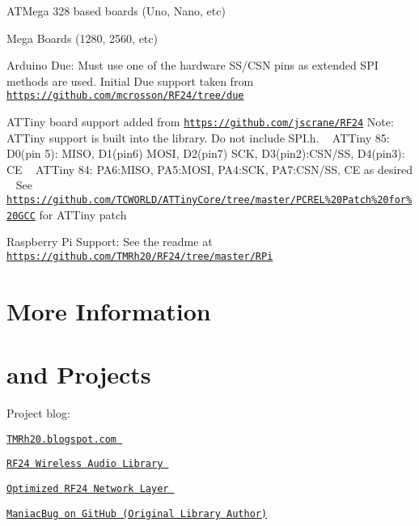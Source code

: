 \begin{DoxyItemize}
\item A\+T\+Mega 328 based boards (Uno, Nano, etc)
\item Mega Boards (1280, 2560, etc)
\item Arduino Due\+: Must use one of the hardware S\+S/\+C\+S\+N pins as extended S\+P\+I methods are used. Initial Due support taken from \href{https://github.com/mcrosson/RF24/tree/due}{\tt https\+://github.\+com/mcrosson/\+R\+F24/tree/due}
\item A\+T\+Tiny board support added from \href{https://github.com/jscrane/RF24}{\tt https\+://github.\+com/jscrane/\+R\+F24} Note\+: A\+T\+Tiny support is built into the library. Do not include S\+P\+I.\+h. ~\newline
 A\+T\+Tiny 85\+: D0(pin 5)\+: M\+I\+S\+O, D1(pin6) M\+O\+S\+I, D2(pin7) S\+C\+K, D3(pin2)\+:C\+S\+N/\+S\+S, D4(pin3)\+: C\+E ~\newline
 A\+T\+Tiny 84\+: P\+A6\+:M\+I\+S\+O, P\+A5\+:M\+O\+S\+I, P\+A4\+:S\+C\+K, P\+A7\+:C\+S\+N/\+S\+S, C\+E as desired ~\newline
 See \href{https://github.com/TCWORLD/ATTinyCore/tree/master/PCREL%20Patch%20for%20GCC}{\tt https\+://github.\+com/\+T\+C\+W\+O\+R\+L\+D/\+A\+T\+Tiny\+Core/tree/master/\+P\+C\+R\+E\+L\%20\+Patch\%20for\%20\+G\+C\+C} for A\+T\+Tiny patch
\item Raspberry Pi Support\+: See the readme at \href{https://github.com/TMRh20/RF24/tree/master/RPi}{\tt https\+://github.\+com/\+T\+M\+Rh20/\+R\+F24/tree/master/\+R\+Pi}
\end{DoxyItemize}\hypertarget{index_More}{}\section{More Information}\label{index_More}
\hypertarget{index_Info}{}\section{and Projects}\label{index_Info}
\begin{DoxyItemize}
\item Project blog\+: \item \href{http://TMRh20.blogspot.com}{\tt T\+M\+Rh20.\+blogspot.\+com } \item \href{http://tmrh20.github.io/RF24Audio/}{\tt R\+F24 Wireless Audio Library } \item \href{https://github.com/TMRh20/RF24Network}{\tt Optimized R\+F24 Network Layer } \item \href{https://github.com/maniacbug/RF24}{\tt Maniac\+Bug on Git\+Hub (Original Library Author)} \end{DoxyItemize}
